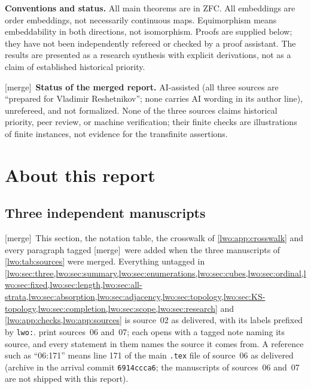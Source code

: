 \documentclass[11pt,a4paper]{article}
\theoremstyle{definition}
\theoremstyle{remark}
\newcommand{\merge}{\textsf{[merge]}}
\begin{document}
\begin{resultbox}
\textbf{Conventions and status.} All main theorems are in ZFC. All embeddings
are order embeddings, not necessarily continuous maps. Equimorphism means
embeddability in both directions, not isomorphism. Proofs are supplied below;
they have not been independently refereed or checked by a proof assistant.
The results are presented as a research synthesis with explicit derivations,
not as a claim of established historical priority.

\smallskip
\merge\ \textbf{Status of the merged report.} AI-assisted (all three sources
are ``prepared for Vladimir Reshetnikov''; none carries AI wording in its
author line), unrefereed, and not formalized. None of the three sources claims
historical priority, peer review, or machine verification; their finite
checks are illustrations of finite instances, not evidence for the
transfinite assertions.
\end{resultbox}
\clearpage
\setcounter{tocdepth}{1}
\tableofcontents
\clearpage

\section{About this report}\label{lwo:sec:about}

\subsection{Three independent manuscripts}\label{lwo:sec:sources}
\merge\ This section, the notation table, the crosswalk of
\cref{lwo:app:crosswalk} and every paragraph tagged \merge\ were added when
the three manuscripts of \cref{lwo:tab:sources} were merged. Everything
untagged in \cref{lwo:sec:three,lwo:sec:summary,lwo:sec:enumerations,lwo:sec:cubes,lwo:sec:ordinal,lwo:sec:fixed,lwo:sec:length,lwo:sec:all-strata,lwo:sec:absorption,lwo:sec:adjacency,lwo:sec:topology,lwo:sec:KS-topology,lwo:sec:completion,lwo:sec:scope,lwo:sec:research}
and \cref{lwo:app:checks,lwo:app:sources} is source~02 as delivered, with its
labels prefixed by \texttt{lwo:}.
print sources~06 and~07; each opens with a tagged note naming its source,
and every statement in them names the source it comes from. A reference such as ``06:171'' means line
171 of the main \texttt{.tex} file of source~06 as delivered (archive in the
arrival commit \texttt{6914ccca6}; the manuscripts of sources~06 and~07 are
not shipped with this report).
\end{document}
